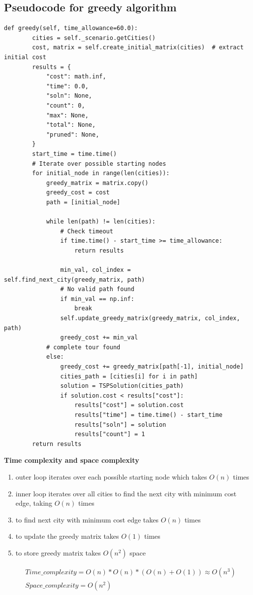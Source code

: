\documentclass[12pt]{article}
\begin{document}
\newpage

\subsection{Pseudocode for greedy algorithm}
\begin{lstlisting}[style=mystyle]
    def greedy(self, time_allowance=60.0):
        cities = self._scenario.getCities()
        cost, matrix = self.create_initial_matrix(cities)  # extract initial cost
        results = {
            "cost": math.inf,
            "time": 0.0,
            "soln": None,
            "count": 0,
            "max": None,
            "total": None,
            "pruned": None,
        }
        start_time = time.time()
        # Iterate over possible starting nodes
        for initial_node in range(len(cities)):
            greedy_matrix = matrix.copy()
            greedy_cost = cost
            path = [initial_node]

            while len(path) != len(cities):
                # Check timeout
                if time.time() - start_time >= time_allowance:
                    return results

                min_val, col_index = self.find_next_city(greedy_matrix, path)
                # No valid path found
                if min_val == np.inf:
                    break
                self.update_greedy_matrix(greedy_matrix, col_index, path)
                greedy_cost += min_val
            # complete tour found
            else:
                greedy_cost += greedy_matrix[path[-1], initial_node]
                cities_path = [cities[i] for i in path]
                solution = TSPSolution(cities_path)
                if solution.cost < results["cost"]:
                    results["cost"] = solution.cost
                    results["time"] = time.time() - start_time
                    results["soln"] = solution
                    results["count"] = 1
        return results
    \end{lstlisting}

\noindent\textbf{Time complexity and space complexity}
\begin{enumerate}
    \item outer loop iterates over each possible starting node which takes $O(n)$ times
    \item inner loop iterates over all cities to find the next city with minimum cost edge, taking $O(n)$ times
    \item to find next city with minimum cost edge takes $O(n)$ times
    \item to update the greedy matrix takes $O(1)$ times
    \item to store greedy matrix takes $O(n^2)$ space 
\end{enumerate}
\begin{equation} %
\begin{split}
    &Time\_complexity = O(n) * O(n) * (O(n) + O(1)) \approx O(n^3)\\
    &Space\_complexity = O(n^2) 
\end{split}
\end{equation}
\end{document}
